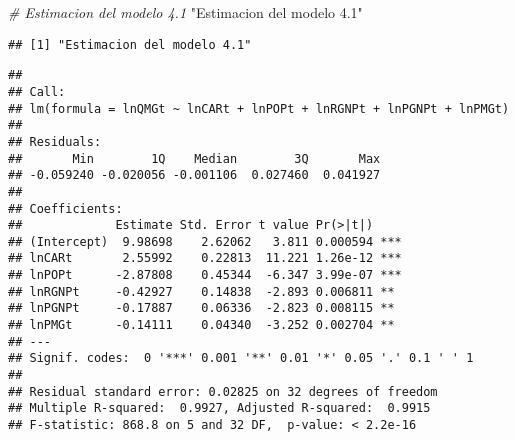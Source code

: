\documentclass[
]{article}
\newenvironment{Shaded}{\begin{snugshade}}{\end{snugshade}}
\newcommand{\CommentTok}[1]{\textcolor[rgb]{0.56,0.35,0.01}{\textit{#1}}}
\newcommand{\FloatTok}[1]{\textcolor[rgb]{0.00,0.00,0.81}{#1}}
\newcommand{\KeywordTok}[1]{\textcolor[rgb]{0.13,0.29,0.53}{\textbf{#1}}}
\newcommand{\NormalTok}[1]{#1}
\newcommand{\OperatorTok}[1]{\textcolor[rgb]{0.81,0.36,0.00}{\textbf{#1}}}
\newcommand{\StringTok}[1]{\textcolor[rgb]{0.31,0.60,0.02}{#1}}
\begin{document}
\begin{Shaded}
\begin{Highlighting}[]
\CommentTok{# Estimacion del modelo 4.1}
\StringTok{"Estimacion del modelo 4.1"}
\end{Highlighting}
\end{Shaded}

\begin{verbatim}
## [1] "Estimacion del modelo 4.1"
\end{verbatim}

\begin{Shaded}
\end{Shaded}

\begin{verbatim}
## 
## Call:
## lm(formula = lnQMGt ~ lnCARt + lnPOPt + lnRGNPt + lnPGNPt + lnPMGt)
## 
## Residuals:
##       Min        1Q    Median        3Q       Max 
## -0.059240 -0.020056 -0.001106  0.027460  0.041927 
## 
## Coefficients:
##             Estimate Std. Error t value Pr(>|t|)    
## (Intercept)  9.98698    2.62062   3.811 0.000594 ***
## lnCARt       2.55992    0.22813  11.221 1.26e-12 ***
## lnPOPt      -2.87808    0.45344  -6.347 3.99e-07 ***
## lnRGNPt     -0.42927    0.14838  -2.893 0.006811 ** 
## lnPGNPt     -0.17887    0.06336  -2.823 0.008115 ** 
## lnPMGt      -0.14111    0.04340  -3.252 0.002704 ** 
## ---
## Signif. codes:  0 '***' 0.001 '**' 0.01 '*' 0.05 '.' 0.1 ' ' 1
## 
## Residual standard error: 0.02825 on 32 degrees of freedom
## Multiple R-squared:  0.9927, Adjusted R-squared:  0.9915 
## F-statistic: 868.8 on 5 and 32 DF,  p-value: < 2.2e-16
\end{verbatim}
\end{document}
